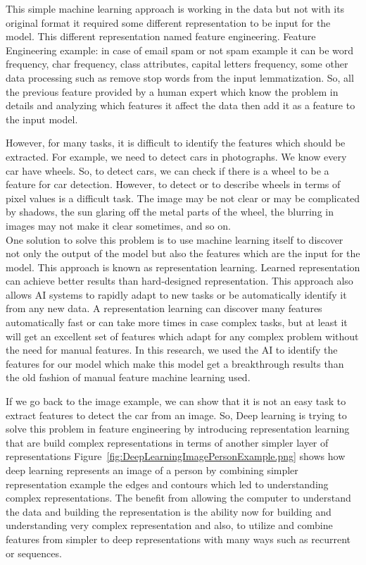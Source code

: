       This simple machine learning approach is working in the data but not with its original format it required some different representation to be input for the model. This different representation named feature engineering. Feature Engineering example: in case of email spam or not spam example it can be word frequency, char frequency, class attributes, capital letters frequency, some other data processing such as remove stop words from the input lemmatization. So, all the previous feature provided by a human expert which know the problem in details and analyzing which features it affect the data then add it as a feature to the input model.
      \newpage

      However, for many tasks, it is difficult to identify the features which should be extracted. For example, we need to detect cars in photographs. We know every car have wheels. So, to detect cars, we can check if there is a wheel to be a feature for car detection. However, to detect or to describe wheels in terms of pixel values is a difficult task. The image may be not clear or may be complicated by shadows, the sun glaring off the metal parts of the wheel, the blurring in images may not make it clear sometimes, and so on\cite{Goodfellow-et-al-2016}.\\

      One solution to solve this problem is to use machine learning itself to discover not only the output of the model but also the features which are the input for the model. This approach is known as representation learning. Learned representation can achieve better results than hard-designed representation. This approach also allows AI systems to rapidly adapt to new tasks or be automatically identify it from any new data. A representation learning can discover many features automatically fast or can take more times in case complex tasks, but at least it will get an excellent set of features which adapt for any complex problem without the need for manual features. In this research, we used the AI to identify the features for our model which make this model get a breakthrough results than the old fashion of manual feature machine learning used.

      If we go back to the image example, we can show that it is not an easy task to extract features to detect the car from an image. So, Deep learning is trying to solve this problem in feature engineering by introducing representation learning that are build complex representations in terms of another simpler layer of representations Figure~\ref{fig:DeepLearningImagePersonExample.png} shows how deep learning represents an image of a person by combining simpler representation example the edges and contours which led to understanding complex representations. The benefit from allowing the computer to understand the data and building the representation is the ability now for building and understanding very complex representation and also, to utilize and combine features from simpler to deep representations with many ways such as recurrent or sequences.

